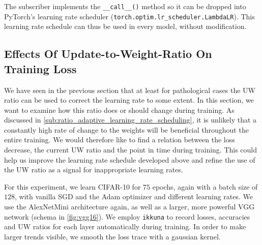 The subscriber implements the \verb+__call__()+ method so it can be dropped into
PyTorch's learning rate scheduler (\verb+torch.optim.lr_scheduler.LambdaLR+).
This learning rate schedule can thus be used in every model, without modification.


\subsection{Effects Of Update-to-Weight-Ratio On Training Loss}%
\label{sub:effects_update_to_weight_ratio_on_training_loss}

We have seen in the previous section that at least for pathological cases the UW
ratio can be used to correct the learning rate to some extent. In this section,
we want to examine how this ratio does or should change during training. As
discussed in \cref{sub:ratio_adaptive_learning_rate_scheduling}, it is unlikely
that a constantly high rate of change to the weights will be beneficial
throughout the entire training. We would therefore like to find a relation
between the loss decrease, the current UW ratio and the point in time during
training. This could help us improve the learning rate schedule developed above
and refine the use of the UW ratio as a signal for inappropriate learning rates.

For this experiment, we learn CIFAR-10 for $75$ epochs, again with a batch size
of $128$, with vanilla SGD and the Adam optimizer and different learning rates.
We use the AlexNetMini architecture again, as well as a larger, more powerful
VGG network (schema in \cref{fig:vgg16}). We employ \verb+ikkuna+ to record
losses, accuracies and UW ratios for each layer automatically during training.
In order to make larger trends visible, we smooth the loss trace with a gaussian
kernel.

